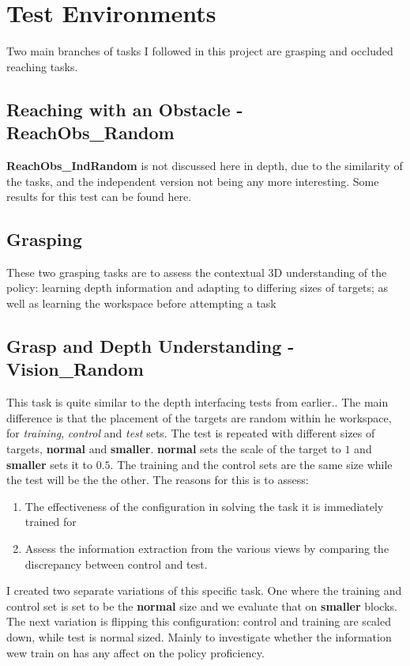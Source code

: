 \section{Test Environments}
Two main branches of tasks I followed in this project are grasping and occluded reaching tasks.

\subsection{Reaching with an Obstacle - \textbf{ReachObs\_Random}}

\textbf{ReachObs\_IndRandom} is not discussed here in depth, due to the similarity of the tasks, and the independent version not being any more interesting. Some results for this test can be found here.

\subsection{Grasping}
These two grasping tasks are to assess the contextual 3D understanding of the policy: learning depth information and adapting to differing sizes of targets; as well as learning the workspace before attempting a task 

\subsection{Grasp and Depth Understanding - \textbf{Vision\_Random}}
This task is quite similar to the depth interfacing tests from earlier.. The main difference is that the placement of the targets are random within he workspace, for \emph{training}, \emph{control} and \emph{test} sets. The test is repeated with different sizes of targets, \textbf{normal} and \textbf{smaller}. \textbf{normal} sets the scale of the target to $1$ and \textbf{smaller} sets it to $0.5$. The training and the control sets are the same size while the test will be the the other. The reasons for this is to assess:
\begin{enumerate}
  \item The effectiveness of the configuration in solving the task it is immediately trained for
  \item Assess the information extraction from the various views by comparing the discrepancy between control and test.
\end{enumerate}
I created two separate variations of this specific task. One where the training and control set is set to be the \textbf{normal} size and we evaluate that on \textbf{smaller} blocks. The next variation is flipping this configuration: control and training are scaled down, while test is normal sized. Mainly to investigate whether the information wew train on has any affect on the policy proficiency.

